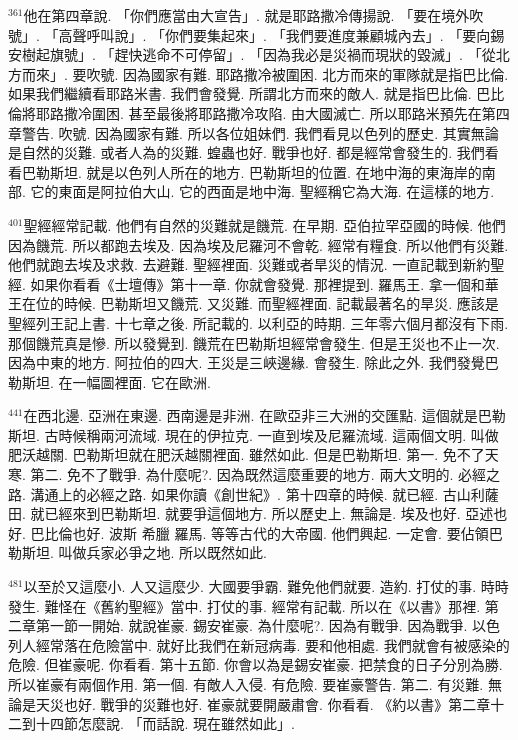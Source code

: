 \documentclass{book}
\begin{document}
$^{361}$他在第四章說.
「你們應當由大宣告」.
就是耶路撒冷傳揚說.
「要在境外吹號」.
「高聲呼叫說」.
「你們要集起來」.
「我們要進度兼顧城內去」.
「要向錫安樹起旗號」.
「趕快逃命不可停留」.
「因為我必是災禍而現狀的毀滅」.
「從北方而來」.
要吹號.
因為國家有難.
耶路撒冷被圍困.
北方而來的軍隊就是指巴比倫.
如果我們繼續看耶路米書.
我們會發覺.
所謂北方而來的敵人.
就是指巴比倫.
巴比倫將耶路撒冷圍困.
甚至最後將耶路撒冷攻陷.
由大國滅亡.
所以耶路米預先在第四章警告.
吹號.
因為國家有難.
所以各位姐妹們.
我們看見以色列的歷史.
其實無論是自然的災難.
或者人為的災難.
蝗蟲也好.
戰爭也好.
都是經常會發生的.
我們看看巴勒斯坦.
就是以色列人所在的地方.
巴勒斯坦的位置.
在地中海的東海岸的南部.
它的東面是阿拉伯大山.
它的西面是地中海.
聖經稱它為大海.
在這樣的地方.

$^{401}$聖經經常記載.
他們有自然的災難就是饑荒.
在早期.
亞伯拉罕亞國的時候.
他們因為饑荒.
所以都跑去埃及.
因為埃及尼羅河不會乾.
經常有糧食.
所以他們有災難.
他們就跑去埃及求救.
去避難.
聖經裡面.
災難或者旱災的情況.
一直記載到新約聖經.
如果你看看《士壇傳》第十一章.
你就會發覺.
那裡提到.
羅馬王.
拿一個和華王在位的時候.
巴勒斯坦又饑荒.
又災難.
而聖經裡面.
記載最著名的旱災.
應該是聖經列王記上書.
十七章之後.
所記載的.
以利亞的時期.
三年零六個月都沒有下雨.
那個饑荒真是慘.
所以發覺到.
饑荒在巴勒斯坦經常會發生.
但是王災也不止一次.
因為中東的地方.
阿拉伯的四大.
王災是三峽邊緣.
會發生.
除此之外.
我們發覺巴勒斯坦.
在一幅圖裡面.
它在歐洲.

$^{441}$在西北邊.
亞洲在東邊.
西南邊是非洲.
在歐亞非三大洲的交匯點.
這個就是巴勒斯坦.
古時候稱兩河流域.
現在的伊拉克.
一直到埃及尼羅流域.
這兩個文明.
叫做肥沃越關.
巴勒斯坦就在肥沃越關裡面.
雖然如此.
但是巴勒斯坦.
第一.
免不了天寒.
第二.
免不了戰爭.
為什麼呢?.
因為既然這麼重要的地方.
兩大文明的.
必經之路.
溝通上的必經之路.
如果你讀《創世紀》.
第十四章的時候.
就已經.
古山利薩田.
就已經來到巴勒斯坦.
就要爭這個地方.
所以歷史上.
無論是.
埃及也好.
亞述也好.
巴比倫也好.
波斯 希臘 羅馬.
等等古代的大帝國.
他們興起.
一定會.
要佔領巴勒斯坦.
叫做兵家必爭之地.
所以既然如此.

$^{481}$以至於又這麼小.
人又這麼少.
大國要爭霸.
難免他們就要.
造約.
打仗的事.
時時發生.
難怪在《舊約聖經》當中.
打仗的事.
經常有記載.
所以在《以書》那裡.
第二章第一節一開始.
就說崔豪.
錫安崔豪.
為什麼呢?.
因為有戰爭.
因為戰爭.
以色列人經常落在危險當中.
就好比我們在新冠病毒.
要和他相處.
我們就會有被感染的危險.
但崔豪呢.
你看看.
第十五節.
你會以為是錫安崔豪.
把禁食的日子分別為勝.
所以崔豪有兩個作用.
第一個.
有敵人入侵.
有危險.
要崔豪警告.
第二.
有災難.
無論是天災也好.
戰爭的災難也好.
崔豪就要開嚴肅會.
你看看.
《約以書》第二章十二到十四節怎麼說.
「而話說.
現在雖然如此」.
\end{document}
